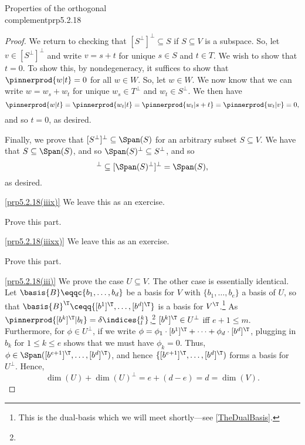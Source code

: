 \begin{prp}{Properties of the orthogonal \\ complement}{prp5.2.18}
\begin{proof}
		We return to checking that $[S^{\perp}]^{\perp}\subseteq S$ if $S\subseteq V$ is a subspace.  So, let $v\in [S^{\perp}]^{\perp}$ and write $v=s+t$ for unique $s\in S$ and $t\in T$.  We wish to show that $t=0$.  To show this, by nondegeneracy, it suffices to show that $\pinnerprod{w|t}=0$ for all $w\in W$.  So, let $w\in W$.  We now know that we can write $w=w_s+w_t$ for unique $w_s\in T^{\perp}$ and $w_t\in S^{\perp}$.  We then have
		\begin{equation}
		\pinnerprod{w|t}=\pinnerprod{w_t|t}=\pinnerprod{w_t|s+t}=\pinnerprod{w_t|v}=0,
		\end{equation}
		and so $t=0$, as desired.
		
		Finally, we prove that $[S^{\perp}]^{\perp}\subseteq \Span (S)$ for an arbitrary subset $S\subseteq V$.  We have that $S\subseteq \Span (S)$, and so $\Span (S)^{\perp}\subseteq S^{\perp}$, and so
		\begin{equation}
		[S^{\perp}]^{\perp}\subseteq [\Span (S)^{\perp}]^{\perp}=\Span (S),
		\end{equation}
		as desired.
		
		\blni
		\cref{prp5.2.18(iiix)} We leave this as an exercise.
		\begin{exr}[breakable=false]{}{}
			Prove this part.
		\end{exr}
		
		\blni
		\cref{prp5.2.18(iiixx)} We leave this as an exercise.
		\begin{exr}[breakable=false]{}{}
			Prove this part.
		\end{exr}
		
		\blni
		\cref{prp5.2.18(iii)} We prove the case $U\subseteq V$.  The other case is essentially identical.  Let $\basis{B}\eqqc \{ b_1,\ldots ,b_d\}$ be a basis for $V$ with $\{ b_1,\ldots ,b_e\}$ a basis of $U$, so that $\basis{B}^{\T}\ceqq \{ [b^1]^{\T},\ldots ,[b^d]^{\T}\}$ is a basis for $V^{\T}$.\footnote{This is the dual-basis which we will meet shortly---see \cref{TheDualBasis}.}  As $\pinnerprod{[b^k]^{\T}|b_l}=\delta \indices{^k_l}$,\footnote{} $[b^k]^{\T}\in U^{\perp}$ iff $e+1\leq m$.  Furthermore, for $\phi \in U^{\perp}$, if we write $\phi =\phi _1\cdot [b^1]^{\T}+\cdots +\phi _d\cdot [b^d]^{\T}$, plugging in $b_k$ for $1\leq k\leq e$ shows that we must have $\phi _k=0$.  Thus, $\phi \in \Span ([b^{e+1}]^{\T},\ldots ,[b^d]^{\T})$, and hence $\{ [b^{e+1}]^{\T},\ldots ,[b^d]^{\T})$ forms a basis for $U^{\perp}$.  Hence,
		\begin{equation}
			\dim (U)+\dim (U)^{\perp}=e+(d-e)=d=\dim (V).
		\end{equation}
	\end{proof}
\end{prp}
